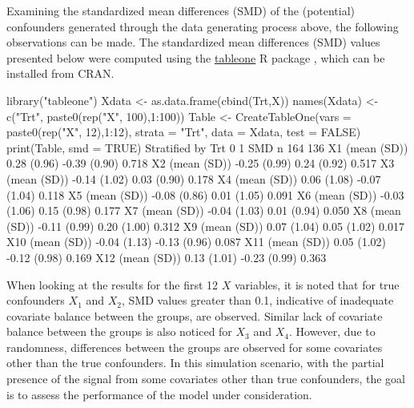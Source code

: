 Examining the standardized mean differences (SMD) of the (potential) confounders generated through the data generating process above, the following observations can be made. The standardized mean differences (SMD) values presented below were computed using the \href{https://cran.r-project.org/package=tableone}{tableone} R package \citep{tableone}, which can be installed from CRAN.
\begin{example}
library("tableone")
Xdata <- as.data.frame(cbind(Trt,X))
names(Xdata) <- c("Trt", paste0(rep("X", 100),1:100))
Table <- CreateTableOne(vars = paste0(rep("X", 12),1:12), strata = "Trt",
     data = Xdata, test = FALSE)
print(Table, smd = TRUE)
                 Stratified by Trt
                  0            1            SMD
  n                 164          136
  X1 (mean (SD))   0.28 (0.96) -0.39 (0.90)  0.718
  X2 (mean (SD))  -0.25 (0.99)  0.24 (0.92)  0.517
  X3 (mean (SD))  -0.14 (1.02)  0.03 (0.90)  0.178
  X4 (mean (SD))   0.06 (1.08) -0.07 (1.04)  0.118
  X5 (mean (SD))  -0.08 (0.86)  0.01 (1.05)  0.091
  X6 (mean (SD))  -0.03 (1.06)  0.15 (0.98)  0.177
  X7 (mean (SD))  -0.04 (1.03)  0.01 (0.94)  0.050
  X8 (mean (SD))  -0.11 (0.99)  0.20 (1.00)  0.312
  X9 (mean (SD))   0.07 (1.04)  0.05 (1.02)  0.017
  X10 (mean (SD)) -0.04 (1.13) -0.13 (0.96)  0.087
  X11 (mean (SD))  0.05 (1.02) -0.12 (0.98)  0.169
  X12 (mean (SD))  0.13 (1.01) -0.23 (0.99)  0.363
\end{example}

When looking at the results for the first 12 $X$ variables, it is noted that for true confounders $X_1$ and $X_2$, SMD values greater than 0.1, indicative of inadequate covariate balance between the groups, are observed. Similar lack of covariate balance between the groups is also noticed for $X_3$ and $X_4$. However, due to randomness, differences between the groups are observed for some covariates other than the true confounders. In this simulation scenario, with the partial presence of the signal from some covariates other than true confounders, the goal is to assess the performance of the model under consideration.


